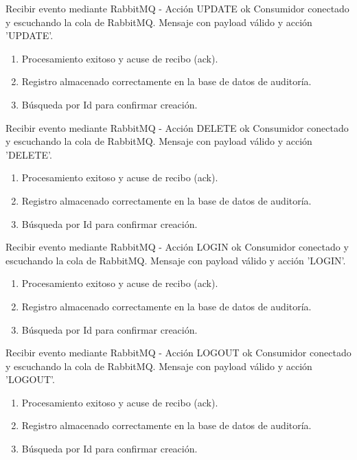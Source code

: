 {Recibir evento mediante RabbitMQ - Acción UPDATE ok}
{Consumidor conectado y escuchando la cola de RabbitMQ.}
{Mensaje con payload válido y acción 'UPDATE'.}
{\begin{enumerate} [leftmargin=*, nosep]
    \item Procesamiento exitoso y acuse de recibo (ack).
    \item Registro almacenado correctamente en la base de datos de auditoría.
    \item Búsqueda por Id para confirmar creación.
\end{enumerate}}

{Recibir evento mediante RabbitMQ - Acción DELETE ok}
{Consumidor conectado y escuchando la cola de RabbitMQ.}
{Mensaje con payload válido y acción 'DELETE'.}
{\begin{enumerate} [leftmargin=*, nosep]
    \item Procesamiento exitoso y acuse de recibo (ack).
    \item Registro almacenado correctamente en la base de datos de auditoría.
    \item Búsqueda por Id para confirmar creación.
\end{enumerate}}

{Recibir evento mediante RabbitMQ - Acción LOGIN ok}
{Consumidor conectado y escuchando la cola de RabbitMQ.}
{Mensaje con payload válido y acción 'LOGIN'.}
{\begin{enumerate} [leftmargin=*, nosep]
    \item Procesamiento exitoso y acuse de recibo (ack).
    \item Registro almacenado correctamente en la base de datos de auditoría.
    \item Búsqueda por Id para confirmar creación.
\end{enumerate}}

{Recibir evento mediante RabbitMQ - Acción LOGOUT ok}
{Consumidor conectado y escuchando la cola de RabbitMQ.}
{Mensaje con payload válido y acción 'LOGOUT'.}
{\begin{enumerate} [leftmargin=*, nosep]
    \item Procesamiento exitoso y acuse de recibo (ack).
    \item Registro almacenado correctamente en la base de datos de auditoría.
    \item Búsqueda por Id para confirmar creación.
\end{enumerate}}

